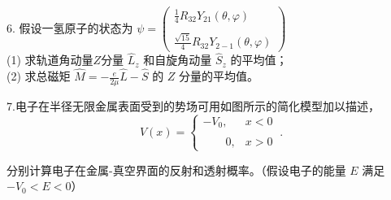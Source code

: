 6. 假设一氢原子的状态为
$\psi = \begin{pmatrix}\frac{1}{4} R_{32}  Y_{21}(\theta, \varphi) \\\\\frac{\sqrt{15}}{4} R_{32}  Y_{2-1}(\theta, \varphi)\end{pmatrix}$\\
(1) 求轨道角动量$Z$分量 $\hat{L}_z$ 和自旋角动量 $\hat{S}_z$ 的平均值；\\
(2) 求总磁矩 $\hat{M} = -\frac{e}{2\mu}\hat{L} - \hat{S}$ 的 $  Z$ 分量的平均值。

7.电子在半径无限金属表面受到的势场可用如图所示的简化模型加以描述，
\begin{equation}
V(x) =
\begin{cases}
-V_0, & x < 0 \\\\
\qquad0, & x > 0
\end{cases}~.
\end{equation}

分别计算电子在金属-真空界面的反射和透射概率。（假设电子的能量 $E$ 满足 $-V_0 < E < 0$）
